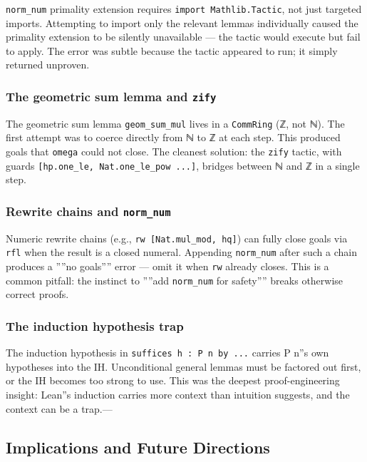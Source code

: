 \documentclass[12pt,a4paper]{article}
\begin{document}
\texttt{norm\_num} primality extension requires \texttt{import Mathlib.Tactic}, not just targeted imports. Attempting to import only the relevant lemmas individually caused the primality extension to be silently unavailable --- the tactic would execute but fail to apply. The error was subtle because the tactic appeared to run; it simply returned unproven.

\subsubsection{The geometric sum lemma and \texttt{zify}}

The geometric sum lemma \texttt{geom\_sum\_mul} lives in a \texttt{CommRing} (ℤ, not ℕ). The first attempt was to coerce directly from ℕ to ℤ at each step. This produced goals that \texttt{omega} could not close. The cleanest solution: the \texttt{zify} tactic, with guards \texttt{{[}hp.one\_le, Nat.one\_le\_pow ...{]}}, bridges between ℕ and ℤ in a single step.

\subsubsection{Rewrite chains and \texttt{norm\_num}}

Numeric rewrite chains (e.g., \texttt{rw {[}Nat.mul\_mod, hq{]}}) can fully close goals via \texttt{rfl} when the result is a closed numeral. Appending \texttt{norm\_num} after such a chain produces a ''''no goals'''' error --- omit it when \texttt{rw} already closes. This is a common pitfall: the instinct to ''''add \texttt{norm\_num} for safety'''' breaks otherwise correct proofs.

\subsubsection{The induction hypothesis trap}

The induction hypothesis in \texttt{suffices h : P n by ...} carries P n''s own hypotheses into the IH. Unconditional general lemmas must be factored out first, or the IH becomes too strong to use. This was the deepest proof-engineering insight: Lean''s induction carries more context than intuition suggests, and the context can be a trap.---

\subsection{Implications and Future Directions}
\end{document}
